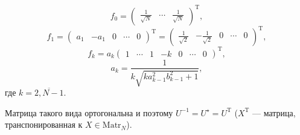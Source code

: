 \begin{lemma}
\begin{minipage}{0.9\textwidth}
            \[f_0 = \begin{pmatrix} \frac{1}{\sqrt N} & \cdots & \frac{1}{\sqrt N} \end{pmatrix}^{\mathrm{T}}, \]
            \[
                f_1
             = \begin{pmatrix}a_1 & -a_1 & 0 & \cdots & 0 \end{pmatrix}^\mathrm{T}
                 = \begin{pmatrix}\frac1{\sqrt2} & - \frac{1}{\sqrt2} & 0 & \cdots & 0 \end{pmatrix}^\mathrm{T},
                     \]
            \[
                f_k =
                a_k
                \begin{pmatrix}1 & \cdots & 1 & -k & 0 & \cdots & 0 \end{pmatrix}^\mathrm{T},
                \]
            \[
                a_k = \frac{1}{k\sqrt{k a_{k-1}^2 b_{k-1}^2 + 1}},
            \]
        где \( k=\overline{2,N-1}. \)

                 Матрица такого вида ортогональна и поэтому
            \( U^{-1} = U^\star = U^{\mathrm{T}} \)
            (\( X^\mathrm{T} \) --- матрица, транспонированная к \( X\in\mathrm{Matr}_N \)).
        \end{minipage}
\end{lemma}
